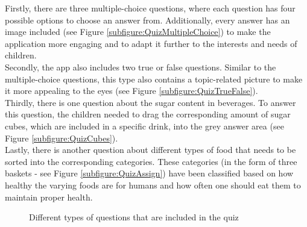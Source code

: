 Firstly, there are three multiple-choice questions, where each question has four possible options to choose an answer from. Additionally, every answer has an image included (see Figure \ref{subfigure:QuizMultipleChoice}) to make the application more engaging and to adapt it further to the interests and needs of children. \\
Secondly, the app also includes two true or false questions. Similar to the multiple-choice questions, this type also contains a topic-related picture to make it more appealing to the eyes (see Figure \ref{subfigure:QuizTrueFalse}).\\
Thirdly, there is one question about the sugar content in beverages. To answer this question, the children needed to drag the corresponding amount of sugar cubes, which are included in a specific drink, into the grey answer area (see Figure \ref{subfigure:QuizCubes}).\\
Lastly, there is another question about different types of food that needs to be sorted into the corresponding categories. These categories (in the form of three baskets - see Figure \ref{subfigure:QuizAssign}) have been classified based on how healthy the varying foods are for humans and how often one should eat them to maintain proper health. 
\begin{figure}[!ht]
    \centering
    \qquad
    \caption[
        Different types of simple questions included in the quiz %
    ]{
        Different types of questions that are included in the quiz
    }
    \label{figure:QuizQuestions}
\end{figure}

